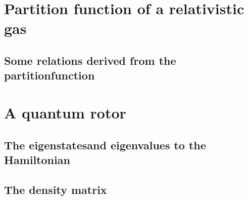 \documentclass[11pt,letter, swedish, english
]{article}
\begin{document}
\section{Partition function of a relativistic gas}

\subsection*{Some relations derived from the partitionfunction}



\section{A quantum rotor}

\subsection{The eigenstatesand eigenvalues to the Hamiltonian}


\subsection{The density matrix}
\end{document}
